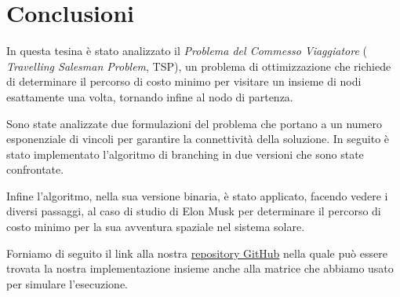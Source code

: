 \chapter{Conclusioni}


In questa tesina è stato analizzato il \textit{Problema del Commesso Viaggiatore} ( \textit{Travelling Salesman Problem}, TSP), un problema di ottimizzazione che richiede di determinare il percorso di costo minimo per visitare un insieme di nodi esattamente una volta, tornando infine al nodo di partenza. 

Sono state analizzate due formulazioni del problema che portano a un numero esponenziale di vincoli per garantire la connettività della soluzione. In seguito è stato implementato l’algoritmo di branching in due versioni che sono state confrontate. 

Infine l’algoritmo, nella sua versione binaria, è stato applicato, facendo vedere i diversi passaggi, al caso di studio di Elon Musk per determinare il percorso di costo minimo per la sua avventura spaziale nel sistema solare.

Forniamo di seguito il link alla nostra  \href{https://github.com/tkachenko0/Traveling_Salesperson_Problem}{repository GitHub} nella quale può essere trovata la nostra implementazione insieme anche alla matrice che abbiamo usato per simulare l'esecuzione.
